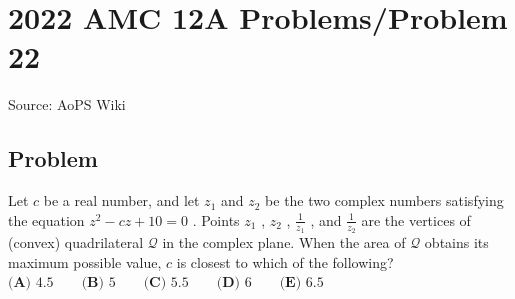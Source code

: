 \documentclass[12pt]{article}
\begin{document}
\section*{{2022 AMC 12A Problems/Problem 22}}
Source: AoPS Wiki

\subsection*{Problem}
Let $c$ be a real number, and let $z_1$ and $z_2$ be the two complex numbers satisfying the equation $z^2 - cz + 10 = 0$ . Points $z_1$ , $z_2$ , $\frac{1}{z_1}$ , and $\frac{1}{z_2}$ are the vertices of (convex) quadrilateral $\mathcal{Q}$ in the complex plane. When the area of $\mathcal{Q}$ obtains its maximum possible value, $c$ is closest to which of the following? $\textbf{(A) }4.5 \qquad\textbf{(B) }5 \qquad\textbf{(C) }5.5 \qquad\textbf{(D) }6\qquad\textbf{(E) }6.5$
\end{document}
